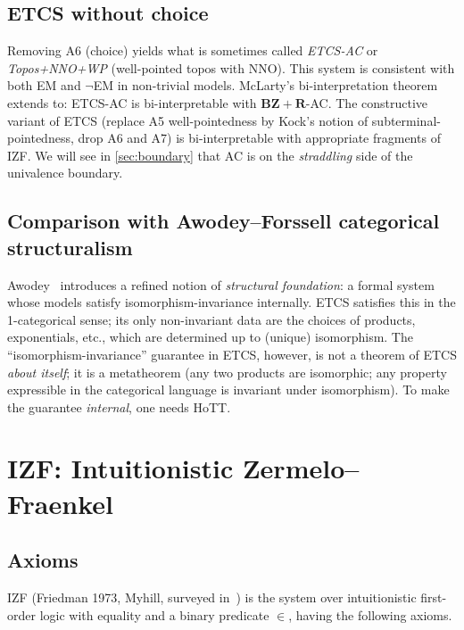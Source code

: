 \documentclass[12pt]{article}
\theoremstyle{definition}
\theoremstyle{remark}
\begin{document}
\subsection{ETCS without choice}

Removing A6 (choice) yields what is sometimes called \emph{ETCS-AC} or \emph{Topos+NNO+WP}
(well-pointed topos with NNO). This system is consistent with both EM and $\neg$EM in
non-trivial models. McLarty's bi-interpretation theorem extends to: ETCS-AC is
bi-interpretable with $\mathbf{BZ}+\mathbf{R}$-AC. The constructive variant of ETCS
(replace A5 well-pointedness by Kock's notion of subterminal-pointedness, drop A6 and A7)
is bi-interpretable with appropriate fragments of IZF. We will see in
\cref{sec:boundary} that AC is on the \emph{straddling} side of the univalence boundary.

\subsection{Comparison with Awodey--Forssell categorical structuralism}

Awodey~\cite{Awodey2014} introduces a refined notion of \emph{structural foundation}: a
formal system whose models satisfy isomorphism-invariance internally. ETCS satisfies
this in the 1-categorical sense; its only non-invariant data are the choices of products,
exponentials, etc., which are determined up to (unique) isomorphism. The
``isomorphism-invariance'' guarantee in ETCS, however, is not a theorem of ETCS
\emph{about itself}; it is a metatheorem (any two products are isomorphic; any property
expressible in the categorical language is invariant under isomorphism). To make the
guarantee \emph{internal}, one needs HoTT.

\section{IZF: Intuitionistic Zermelo--Fraenkel}
\label{sec:izf}

\subsection{Axioms}

IZF (Friedman 1973, Myhill, surveyed in~\cite{StanfordIZFCZF}) is the system over intuitionistic first-order logic with equality
and a binary predicate $\in$, having the following axioms.
\end{document}
